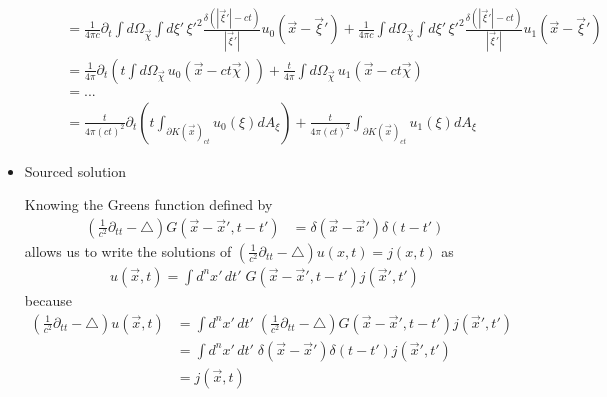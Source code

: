 \documentclass[10pt,a4paper]{book}
\theoremstyle{definition}
\begin{document}
\begin{itemize}
\begin{enumerate}
\begin{align}
&=\frac{1}{4\pi c}\partial_t\int d\Omega_{\vec{\chi}}\int d\xi'\,\xi'^2\frac{\delta(|\vec{\xi}'|-ct)}{|\vec{\xi}'|}u_0(\vec{x}-\vec{\xi}')+\frac{1}{4\pi c}\int d\Omega_{\vec{\chi}}\int d\xi'\,\xi'^2\frac{\delta(|\vec{\xi}'|-ct)}{|\vec{\xi}'|}u_1(\vec{x}-\vec{\xi}')\\
&=\frac{1}{4\pi}\partial_t\left(t\int d\Omega_{\vec{\chi}}\, u_0(\vec{x}-ct\vec{\chi})\right)+\frac{t}{4\pi}\int d\Omega_{\vec{\chi}}\, u_1(\vec{x}-ct\vec{\chi})\\
&=...\\
&=\frac{t}{4\pi(ct)^2}\partial_t\left(t\int_{\partial K(\vec{x})_{ct}}u_0(\xi)dA_\xi\right)+\frac{t}{4\pi(ct)^2}\int_{\partial K(\vec{x})_{ct}}u_1(\xi)dA_\xi
\end{align}
\end{enumerate}

\item Sourced solution

Knowing the Greens function defined by
\begin{align}
\left(\frac{1}{c^2}\partial_{tt}-\triangle\right) G(\vec{x}-\vec{x}',t-t')&=\delta(\vec{x}-\vec{x}')\delta(t-t')
\end{align}
allows us to write the solutions of $\left(\frac{1}{c^2}\partial_{tt}-\triangle\right) u(x,t)= j(x,t)$ as
\begin{align}
u(\vec{x},t)=\int d^nx'\,dt'\;G(\vec{x}-\vec{x}',t-t')j(\vec{x}',t')
\end{align}
because
\begin{align}
\left(\frac{1}{c^2}\partial_{tt}-\triangle\right)u(\vec{x},t)&=\int d^nx'\,dt'\;\left(\frac{1}{c^2}\partial_{tt}-\triangle\right)G(\vec{x}-\vec{x}',t-t')j(\vec{x}',t')\\
&=\int d^nx'\,dt'\;\delta(\vec{x}-\vec{x}')\delta(t-t')j(\vec{x}',t')\\
&=j(\vec{x},t)
\end{align}


\end{itemize}
\end{document}
